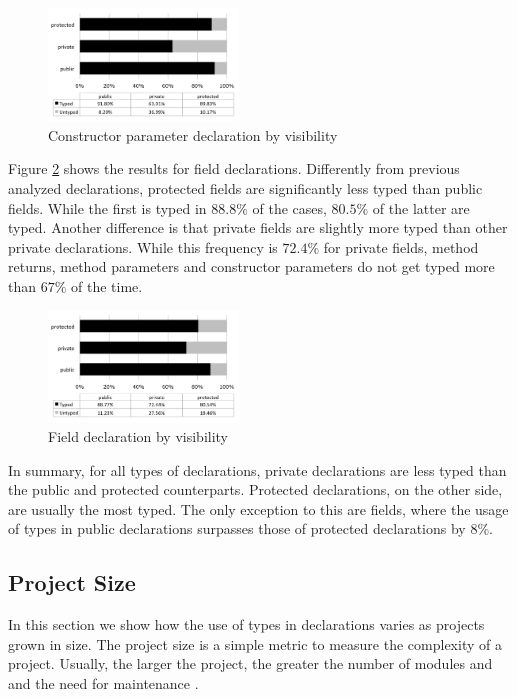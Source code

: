 \documentclass[preprint]{sigplanconf}
\begin{document}
\begin{figure}[ht]
\centering \includegraphics[width=0.45\textwidth]{images/constructor_parameter_visibility} 
\caption{Constructor parameter declaration by visibility}
\label{fig:constructor_parameter_visibility} 
\end{figure}


Figure \ref{fig:field_visibility} shows the results for field declarations. 
Differently from previous analyzed declarations, protected fields are significantly less typed than public fields. 
While the first is typed in $88.8\%$ of the cases, $80.5\%$ of the latter are typed.
Another difference is that private fields are slightly more typed than other private declarations.
While this frequency is $72.4\%$ for private fields, method returns, method parameters and constructor parameters do not get typed more than $67\%$ of the time.


\begin{figure}[ht]
\centering \includegraphics[width=0.45\textwidth]{images/field_visibility} 
\caption{Field declaration by visibility}
\label{fig:field_visibility} 
\end{figure}

In summary, for all types of declarations, private declarations are less typed than the public and protected counterparts.
Protected declarations, on the other side, are usually the most typed. The only exception to this are fields, where the usage of types in public declarations surpasses those of protected declarations by $8\%$.

\subsection{Project Size\label{sub:size-results}}
In this section we show how the use of types in declarations varies as projects grown in size.
The project size is a simple metric to measure the complexity of a project.
Usually, the larger the project, the greater the number of modules and and the need for maintenance \cite{Fenton1998}. 
\end{document}
